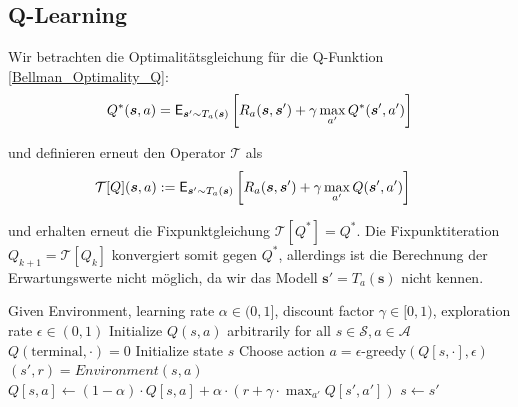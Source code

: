 \newpage

\subsection{Q-Learning}

Wir betrachten die Optimalitätsgleichung für die Q-Funktion \ref{Bellman_Optimality_Q}:
%
\begin{align*}
    Q^{*}(\bm{s}, a) =
    \mathsf{E}_{\bm{s}' \sim T_a(\bm{s})}
    \left[
        \vphantom{\int}
        R_a(\bm{s}, \bm{s}') + \gamma 
        \max_{a'} Q^{*}(\bm{s}', a')
    \right]
\end{align*}

und definieren erneut den Operator $\mathcal{T}$ als
%
\begin{align*}
    \mathcal{T}[Q](\bm{s}, a)
    &:=
    \mathsf{E}_{\bm{s}' \sim T_a(\bm{s})}
    \left[
        \vphantom{\int}
        R_a(\bm{s}, \bm{s}') + \gamma 
        \max_{a'} Q(\bm{s}', a')
    \right]
\end{align*}

und erhalten erneut die Fixpunktgleichung $\mathcal{T}[Q^*] = Q^*$. Die Fixpunktiteration
$Q_{k+1} = \mathcal{T}[Q_k]$ konvergiert somit gegen $Q^*$, 
allerdings ist die Berechnung der Erwartungswerte nicht möglich, 
da wir das Modell $\bm{s}' = T_a(\bm{s})$ nicht kennen.
%

\begin{algorithm}
    \caption{Q-Learning}
    \begin{algorithmic}
        \State Given Environment, 
        learning rate $\alpha \in (0,1]$, 
        discount factor $\gamma \in [0,1)$,
        exploration rate $\epsilon \in (0,1)$
        \State Initialize $Q(s,a)$ arbitrarily for all $s \in \mathcal{S}, a \in \mathcal{A}$
        \State $Q(\text{terminal}, \cdot) = 0$ 
            \State Initialize state $s$
                \State Choose action $a = \epsilon$-greedy$(Q[s,\cdot],\epsilon)$ 
                \State $(s',r) = Environment(s,a)$
                \State $Q[s,a] \leftarrow (1-\alpha) \cdot Q[s,a] 
                + \alpha \cdot (r + \gamma \cdot \max_{a'} Q[s',a'])$
                \State $s \leftarrow s'$
            \EndWhile
        \EndFor
    \end{algorithmic}
\end{algorithm}

